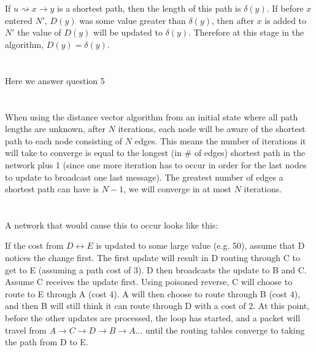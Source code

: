 \documentclass[10pt,a4paper]{article}
\begin{document}
\section{}
If $u\rightsquigarrow x \rightarrow y$ is a shortest path, then the length of this path is $\delta(y)$. If before $x$ entered $N'$, $D(y)$ was some value greater than $\delta(y)$, then after $x$ is added to $N'$ the value of $D(y)$ will be updated to $\delta(y)$. Therefore at this stage in the algorithm, $D(y) = \delta(y)$.
\section{}
Here we answer question 5
\section{}
When using the distance vector algorithm from an initial state where all path lengths are unknown, after $N$ iterations, each node will be aware of the shortest path to each node consisting of $N$ edges. This means the number of iterations it will take to converge is equal to the longest (in # of edges) shortest path in the network plus 1 (since one more iteration has to occur in order for the last nodes to update to broadcast one last message). The greatest number of edges a shortest path can have is $N - 1$, we will converge in at most $N$ iterations.
\section{}
A network that would cause this to occur looks like this:

If the cost from $D \leftrightarrow E$ is updated to some large value (e.g. 50), assume that D notices the change first.
The first update will result in D routing through C to get to E (assuming a path cost of 3). D then broadcasts the update to B and C.
Assume C receives the update first. Using poisoned reverse, C will choose to route to E through A (cost 4). 
A will then choose to route through B (cost 4), and then B will still think it can route through D with a cost of 2.
At this point, before the other updates are processed, the loop has started, and a packet will travel from $A \rightarrow C \rightarrow D \rightarrow B \rightarrow A \ldots$ until the routing tables converge to taking the path from D to E.
\end{document}
